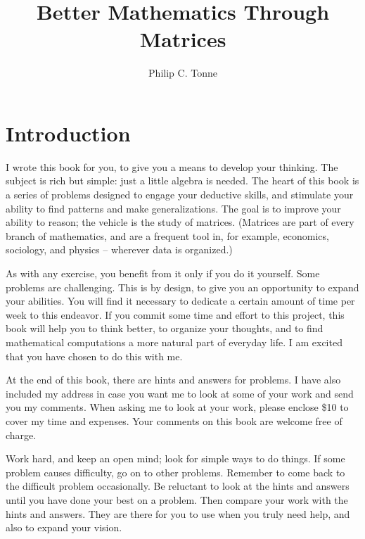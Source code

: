 \documentclass{article}
\let\titlepageAuthor\author
\renewcommand{\author}[1]{\newcommand{\headerAuthor}{#1}\titlepageAuthor{#1}}
\let\titlepageTitle\title
\renewcommand{\title}[1]{\newcommand{\headerTitle}{#1}\titlepageTitle{#1}}
\begin{document}
\title{Better Mathematics Through Matrices}
\author{Philip C. Tonne}
\date{ }
\maketitle
\thispagestyle{empty}



\newpage

\setcounter{tocdepth}{3} 
\tableofcontents
\thispagestyle{empty}


\newpage


\section{Introduction}

I wrote this book for you, to give you a means to develop your thinking. The subject is rich but simple: just a little algebra is needed. The heart of this book is a series of problems designed to engage your deductive skills, and stimulate your ability to find patterns and make generalizations. The goal is to improve your ability to reason; the vehicle is the study of matrices. (Matrices are part of every branch of mathematics, and are a frequent tool in, for example, economics, sociology, and physics -- wherever data is organized.)

As with any exercise, you benefit from it only if you do it yourself. Some problems are challenging. This is by design, to give you an opportunity to expand your abilities. You will find it necessary to dedicate a certain amount of time per week to this endeavor. If you commit some time and effort to this project, this book will help you to think better, to organize your thoughts, and to find mathematical computations a more natural part of everyday life. I am excited that you have chosen to do this with me.

At the end of this book, there are hints and answers for problems. I have also included my address in case you want me to look at some of your work and send you my comments. When asking me to look at your work, please enclose \$10 to cover my time and expenses. Your comments on this book are welcome free of charge.

Work hard, and keep an open mind; look for simple ways to do things. If some problem causes difficulty, go on to other problems. Remember to come back to the difficult problem occasionally. Be reluctant to look at the hints and answers until you have done your best on a problem. Then compare your work with the hints and answers. They are there for you to use when you truly need help, and also to expand your vision.
\end{document}
